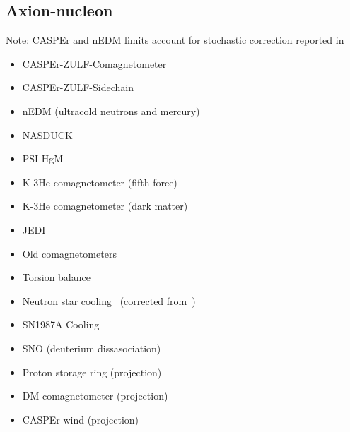 \documentclass[10pt,twocolumn]{extarticle}
\begin{document}
\begin{mdframed}
\vspace{-1em}
\section{Axion-nucleon}\vspace{-0.5em}
Note: CASPEr and nEDM limits account for stochastic correction reported in~\cite{Centers:2019dyn}
\begin{itemize}\setlength\itemsep{-0.5em}
    \item CASPEr-ZULF-Comagnetometer~\cite{Wu:2019exd}
    \item CASPEr-ZULF-Sidechain~\cite{Garcon:2019inh}
    \item nEDM (ultracold neutrons and mercury)~\cite{Abel:2017rtm}
    \item NASDUCK~\cite{Bloch:2021vnn,Bloch:2022kjm}
    \item PSI HgM~\cite{Abel:2022vfg}
    \item K-3He comagnetometer (fifth force)~\cite{Vasilakis2009}
    \item K-3He comagnetometer (dark matter)~\cite{Lee:2022vvb}
    	\item JEDI~\cite{JEDI:2022hxa}
    \item Old comagnetometers~\cite{Bloch:2019lcy}
    \item Torsion balance~\cite{Adelberger:2006dh}
    \item Neutron star cooling~\cite{Buschmann:2021juv} (corrected from~\cite{Beznogov:2018fda})
    \item SN1987A Cooling~\cite{Carenza:2019pxu}
    \item SNO (deuterium dissasociation)~\cite{Bhusal:2020bvx}
    \item Proton storage ring (projection)~\cite{Graham:2020kai}
    \item DM comagnetometer (projection)~\cite{Bloch:2019lcy}
    \item CASPEr-wind (projection)~\cite{Garcon:2019inh}
\end{itemize}
\end{mdframed}
\end{document}
